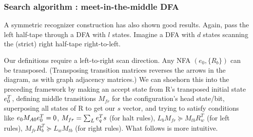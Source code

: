 \subsubsection{Search algorithm : meet-in-the-middle DFA}
\label{far-algo-mtim_dfa}
A symmetric recognizer construction has also shown good results.
Again, pass the left half-tape through a DFA with $l$ states.
Imagine a DFA with $d$ states scanning the (strict) right half-tape right-to-left.

\begin{remark}
    Our definitions require a left-to-right scan direction.
    Any NFA $(e_0, \{R_b\})$ can be transposed.
    (Transposing transition matrices reverses the arrows in the diagram, as with graph adjacency matrices.)
    We can shoehorn this into the preceding framework by making an accept state from R's transposed initial state $e_0^T$,
    defining middle transitions $M_{fr}$ for the configuration's head state/bit,
    superposing all states of R to get our $s$ vector,
    and trying to satisfy conditions like
    $e_0 M_{A0} e_0^T = 0$, $M_{fr}=\sum_L e_q^T s$ (for halt rules),
    $L_b M_{fr} \succeq M_{tb} R^T_w$ (for left rules),
    $M_{fr} R^T_b \succeq L_w M_{tb}$ (for right rules).
    What follows is more intuitive.
\end{remark}


